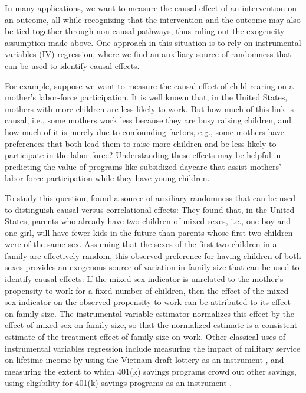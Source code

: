 \documentclass[aos]{imsart}
\theoremstyle{plain}
\theoremstyle{definition}
\theoremstyle{remark}
\begin{document}
\begin{CJK}{UTF8}{gbsn}
In many applications, we want to measure the causal effect of an intervention on
an outcome, all while recognizing that the intervention and the outcome may also be tied
together through non-causal pathways, thus ruling out the exogeneity assumption
made above. One approach in this situation is to rely on
instrumental variables (IV) regression, where we find an auxiliary source of randomness that can
be used to identify causal effects.

For example, suppose we want to measure the causal effect of child rearing on
a mother's labor-force participation. It is well known that, in the United States, mothers with more children are
less likely to work. But how much of this link is causal, i.e., some mothers work less because they
are busy raising children, and how much of it is merely due to confounding factors, e.g., some mothers have
preferences that both lead them to raise more children and be less likely to participate in the
labor force? Understanding these effects may be helpful in predicting the value of programs
like subsidized daycare that assist mothers' labor force participation while they have young children.

To study this question, \citet{angrist1998children} found a source of auxiliary randomness that can
be used to distinguish causal versus correlational effects: They found that, in the United States, parents who already
have two children of mixed sexes, i.e., one boy and one girl, will have fewer kids in the future than parents
whose first two children were of the same sex. Assuming that the sexes of the first two children in a family
are effectively random, this observed preference for having children of both sexes provides an exogenous source
of variation in family size that can be used to identify causal effects: If the mixed sex indicator is unrelated
to the mother's propensity to work for a fixed number of children, then the effect of the mixed sex 
indicator on the observed propensity to work can be attributed to its effect on family size.  The instrumental
variable estimator normalizes this effect by the effect of mixed sex on family size, so that the normalized estimate
is a consistent estimate of the treatment effect of family size on work.
Other classical uses of instrumental variables regression include measuring the impact of military
service on lifetime income by using the Vietnam draft lottery as an instrument \citep{angrist1990lifetime}, 
and measuring the extent to which 401(k) savings programs crowd out other savings, using
eligibility for 401(k) savings programs as an instrument \citep{abadie2003semiparametric,poterba1996retirement}.


\end{CJK}
\end{document}
